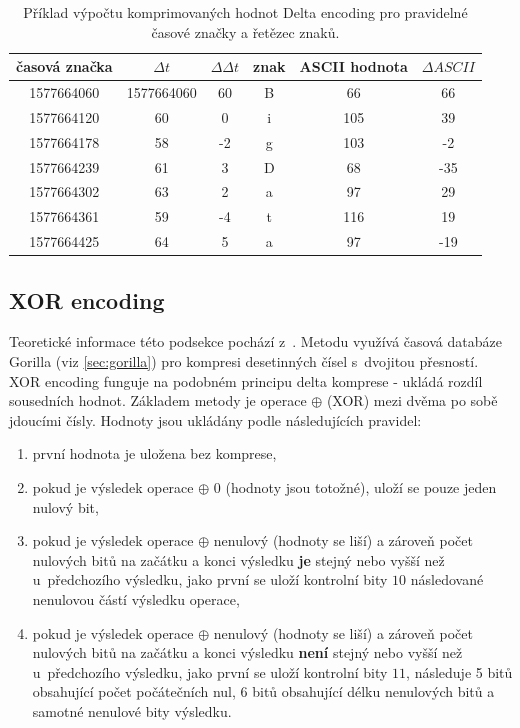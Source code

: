 \begin{table}[h]
    \begin{center}
        \begin{tabular}{|c|c|c||c|c|c|}
        \hline
             časová značka & $\Delta t$ & $\Delta\Delta t$ & znak & ASCII hodnota & $\Delta ASCII$ \\ \hline
             1577664060 & 1577664060 & 60 & B & 66 & 66 \\
             1577664120 & 60 & 0 & i & 105 & 39 \\
             1577664178 & 58 & -2 & g & 103 & -2 \\
             1577664239 & 61 & 3 & D & 68 & -35 \\
             1577664302 & 63 & 2 & a & 97 & 29 \\
             1577664361 & 59 & -4 & t & 116 & 19 \\
             1577664425 & 64 & 5 & a & 97 & -19 \\ \hline
        \end{tabular}
        \caption{Příklad výpočtu komprimovaných hodnot Delta encoding pro pravidelné časové značky a řetězec znaků.} \label{tab:delta}
    \end{center}
\end{table}
\subsection{XOR encoding}\label{sec:xor}
Teoretické informace této podsekce pochází z~\cite{gorilla}. Metodu využívá časová databáze Gorilla (viz \ref{sec:gorilla}) pro kompresi desetinných čísel s~dvojitou přesností. XOR encoding funguje na podobném principu delta komprese - ukládá rozdíl sousedních hodnot. Základem metody je operace $\oplus$ (XOR) mezi dvěma po sobě jdoucími čísly. Hodnoty jsou ukládány podle následujících pravidel:

\begin{enumerate}
    \item první hodnota je uložena bez komprese,
    \item pokud je výsledek operace $\oplus$ 0 (hodnoty jsou totožné), uloží se pouze jeden nulový bit,
    \item pokud je výsledek operace $\oplus$ nenulový (hodnoty se liší) a zároveň počet nulových bitů na začátku a konci výsledku \textbf{je} stejný nebo vyšší než u~předchozího výsledku, jako první se uloží kontrolní bity $10$ následované nenulovou částí výsledku operace,
    \item pokud je výsledek operace $\oplus$ nenulový (hodnoty se liší) a zároveň počet nulových bitů na začátku a konci výsledku \textbf{není} stejný nebo vyšší než u~předchozího výsledku, jako první se uloží kontrolní bity $11$, následuje 5 bitů obsahující počet počátečních nul, 6 bitů obsahující délku nenulových bitů a samotné nenulové bity výsledku.
\end{enumerate}

